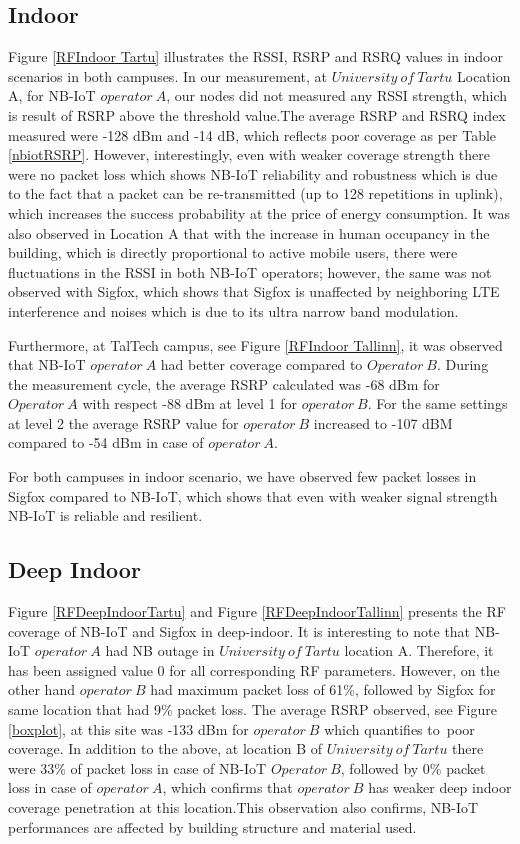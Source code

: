 \documentclass[conference,a4paper,xcolor=table]{IEEEtran}
\begin{document}
\subsection{Indoor}\label{Indoor}

Figure \ref{RFIndoor Tartu} illustrates the RSSI, RSRP and RSRQ values in indoor scenarios in both campuses. In our measurement, at $University\ of\ Tartu$ Location A, for NB-IoT $operator\ A$, our nodes did not measured any RSSI strength, which is result of RSRP above the threshold value.The average RSRP and RSRQ index measured were -128 dBm and -14 dB, which reflects poor coverage as per Table \ref{nbiotRSRP}. However, interestingly, even with weaker coverage strength there were no packet loss which shows NB-IoT reliability and robustness which is due to the fact that a packet can be re-transmitted (up to 128 repetitions in uplink), which increases the success probability at the price of energy consumption.
It was also observed in Location A that with the increase in human occupancy in the building, which is directly proportional to active mobile users, there were fluctuations in the RSSI in both NB-IoT operators; however, the same was not observed with Sigfox, which shows that Sigfox is unaffected by neighboring LTE interference and noises which is due to its ultra narrow band modulation.

Furthermore, at TalTech campus, see Figure \ref{RFIndoor Tallinn}, it was observed that NB-IoT $operator\ A$ had better coverage compared to $Operator\ B$. During the measurement cycle, the average RSRP calculated  was -68 dBm for $Operator\ A$ with respect -88 dBm at level 1 for $operator\ B$. For the same settings at level 2 the average RSRP value for $operator\ B$ increased to -107 dBM compared to -54 dBm in case of $operator\ A$. 

For both campuses in indoor scenario, we have observed few packet losses in Sigfox compared to NB-IoT, which shows that even with weaker signal strength NB-IoT is reliable and resilient.\par


\subsection{Deep Indoor}
Figure \ref{RFDeepIndoorTartu} and Figure \ref{RFDeepIndoorTallinn} presents the RF coverage of NB-IoT and Sigfox in deep-indoor. It is interesting to note that NB-IoT $operator\ A$ had NB outage in $University\ of\ Tartu$ location A. Therefore, it has been assigned value 0 for all corresponding RF parameters. However, on the other hand $operator\ B$ had maximum packet loss of 61\%, followed by Sigfox for same location that had 9\% packet loss. The average RSRP observed, see Figure \ref{boxplot}, at this site was -133 dBm for $operator\ B$ which quantifies to\ poor coverage. In addition to the above, at location B of $University\ of\ Tartu$ there were 33\% of packet loss in case of NB-IoT $Operator\ B$, followed by 0\% packet loss in case of $operator\  A$, which confirms that $operator\ B$ has weaker deep indoor coverage penetration at this location.This observation also confirms, NB-IoT performances are affected by building structure and material used.
\end{document}
